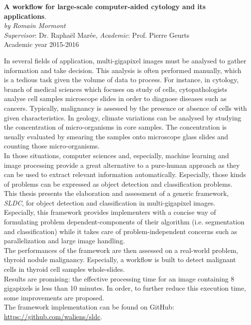 \begin{center}
 
	{\sf \large \textbf{A workflow for large-scale computer-aided cytology and its applications}.}\\
\raggedleft
 	{\sf \textit{by Romain Mormont} }\\
\centering
	{\sf \textit{Supervisor}: Dr. Raphaël Marée, \textit{Academic}: Prof. Pierre Geurts }\\
\centering
	{\sf Academic year 2015-2016 }\

\end{center}
\hfill

In several fields of application, multi-gigapixel images must be analysed to gather information and take decision. This analysis is often performed manually, which is a tedious task given the volume of data to process. For instance, in cytology, branch of medical sciences which focuses on study of cells, cytopathologists analyse cell samples microscope slides in order to diagnose diseases such as cancers. Typically, malignancy is assessed by the presence or absence of cells with given characteristics. In geology, climate variations can be analysed by studying the concentration 
of micro-organisms in core samples. The concentration is usually evaluated by smearing the samples onto microscope glass slides and counting those micro-organisms. \\

In those situations, computer sciences and, especially, machine learning and image processing provide a great alternative to a pure-human approach as they can be used to extract relevant information automatically. Especially, those kinds\\
 of problems can be expressed as object detection and classification problems.
\\

This thesis presents the elaboration and assessment of a generic framework, \textit{SLDC}, for object detection and classification in multi-gigapixel images. Especially, this framework provides implementers with a concise way of formulating problem dependent-components of their algorithm (i.e. segmentation and classification) while it takes care of problem-independent concerns such as parallelization and large image handling. 
\\

The performances of the framework are then assessed on a real-world problem, thyroid nodule malignancy. Especially, a workflow is built to detect malignant cells in thyroid cell samples whole-slides.
\\

Results are promising: the effective processing time for an image containing 8 gigapixels is less than 10 minutes. In order, to further reduce this execution time, some improvements are proposed.
\\

The framework implementation can be found on GitHub: \url{https://github.com/waliens/sldc}.

\hfill
